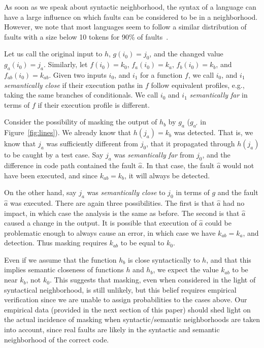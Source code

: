 \documentclass[preprint,nonatbib]{sigplanconf}\usepackage[]{graphicx}\usepackage[]{color}
\begin{document}
As soon as we speak about syntactic neighborhood,
the syntax of a language can have a large influence on which faults can be considered to be in a
neighborhood. However, we note that most languages seem to follow a similar
distribution of faults with a size below 10 tokens for 90\% of faults~\cite{gopinath2014mutations}.

Let us call the original input
to $h$, $g(i_0) = j_0$, and the changed value $g_a(i_0) = j_a$.
Similarly, let $f(i_0) = k_0$, $f_a(i_0) = k_a$, $f_b(i_0) = k_b$,
and $f_{ab}(i_0) = k_{ab}$. Given two inputs $i_0$, and $i_1$ for
a function $f$, we call $i_0$, and $i_1$ \emph{semantically close} if
their execution paths in $f$ follow equivalent profiles, e.g., taking the same
branches of conditionals. We call $i_0$ and $i_1$ \emph{semantically far}
in terms of $f$ if their execution profile is different.

Consider the possibility of masking the output of $h_b$ by $g_a$
($g_{a'}$ in Figure~\ref{fig:lines}). We already
know that $h(j_a) = k_b$ was detected. That is, we know that
$j_a$ was sufficiently different from $j_0$, that it propagated through $h(j_a)$ to be caught by a test case. Say $j_a$ was \emph{semantically far}
from $j_0$, and the difference in code path contained the fault $\hat{a}$.
In that case, the fault $\hat{a}$ would not have been executed, and
since $k_{ab} = k_b$, it will always be detected.

On the other hand, say $j_a$ was \emph{semantically close} to $j_0$ in terms of
$g$ and the fault $\hat{a}$ was executed. There are again three possibilities.
The first is that $\hat{a}$ had no impact, in which case the analysis
is the same as before. The second is that $\hat{a}$ caused a change in the output.
It is possible that execution of $\hat{a}$ could be problematic enough to always
cause an error, in which case we have $k_{ab} = k_a$, and detection.
Thus masking requires $k_{ab}$ to be equal to $k_0$.

Even if we assume that the function $h_b$ is close syntactically to $h$, and
that this implies semantic closeness of functions $h$ and $h_b$, we expect
the value $k_{ab}$ to be near $k_b$, not $k_0$.
This suggests that masking, even when considered in the light of
syntactical neighborhood, is still unlikely, but this belief requires
empirical verification since we are unable to assign probabilities to
the cases above.  Our empirical data (provided in the next section of
this paper) should shed light on the actual incidence of masking when
syntactic/semantic neighborhoods are taken into account, since real
faults are likely in the syntactic and semantic neighborhood of the
correct code.
\end{document}
